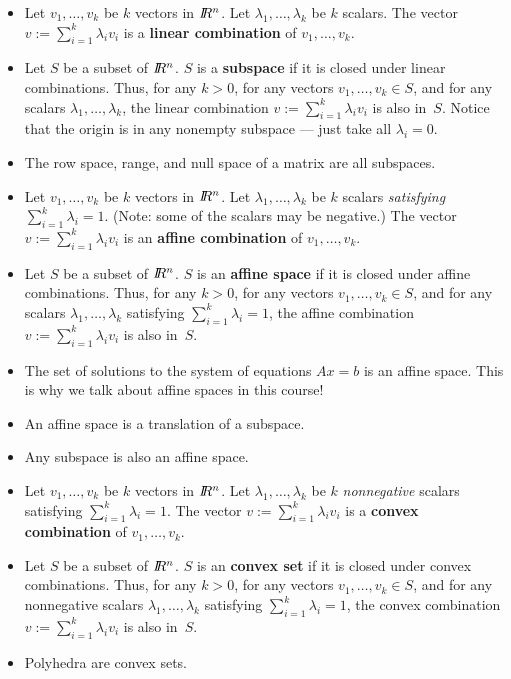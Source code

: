 \begin{itemize}
 \item
Let $v_1,\ldots,v_k$ be $k$ vectors in $I\!\!R^n$.
Let $\lambda_1,\ldots,\lambda_k$ be $k$ scalars.
The vector $v:=\sum_{i=1}^k\lambda_iv_i$ is a
{\bf linear combination} of $v_1,\ldots,v_k$.
 \item
Let $S$ be a subset of $I\!\!R^n$.
$S$ is a {\bf subspace} if it is closed under linear combinations.
Thus, for any $k>0$, for any vectors $v_1,\ldots,v_k \in S$,
and for any scalars $\lambda_1,\ldots,\lambda_k$, the linear
combination $v:=\sum_{i=1}^k\lambda_iv_i$ is also in~$S$.
Notice that the origin is in any nonempty subspace --- just take all
$\lambda_i=0$.
 \item
The row space, range, and null space of a matrix are all subspaces.
 \item
Let $v_1,\ldots,v_k$ be $k$ vectors in $I\!\!R^n$.
Let $\lambda_1,\ldots,\lambda_k$ be $k$ scalars
{\em satisfying $\sum_{i=1}^k\lambda_i=1$}.
(Note: some of the scalars may be negative.)
The vector $v:=\sum_{i=1}^k\lambda_iv_i$ is an
{\bf affine combination} of $v_1,\ldots,v_k$.
 \item
Let $S$ be a subset of $I\!\!R^n$.
$S$ is an {\bf affine space} if it is closed under affine combinations.
Thus, for any $k>0$, for any vectors $v_1,\ldots,v_k \in S$,
and for any scalars $\lambda_1,\ldots,\lambda_k$
satisfying $\sum_{i=1}^k\lambda_i=1$, the affine
combination $v:=\sum_{i=1}^k\lambda_iv_i$ is also in~$S$.
 \item
The set of solutions to the system of equations $Ax=b$ is an
affine space.
This is why we talk about affine spaces in this course!
 \item
An affine space is a translation of a subspace.
 \item
Any subspace is also an affine space.
 \item
Let $v_1,\ldots,v_k$ be $k$ vectors in $I\!\!R^n$.
Let $\lambda_1,\ldots,\lambda_k$ be $k$ {\em nonnegative} scalars
satisfying $\sum_{i=1}^k\lambda_i=1$.
The vector $v:=\sum_{i=1}^k\lambda_iv_i$ is a
{\bf convex combination} of $v_1,\ldots,v_k$.
 \item
Let $S$ be a subset of $I\!\!R^n$.
$S$ is an {\bf convex set} if it is closed under convex combinations.
Thus, for any $k>0$, for any vectors $v_1,\ldots,v_k \in S$,
and for any nonnegative scalars $\lambda_1,\ldots,\lambda_k$
satisfying $\sum_{i=1}^k\lambda_i=1$, the convex
combination $v:=\sum_{i=1}^k\lambda_iv_i$ is also in~$S$.
 \item
Polyhedra are convex sets.

\end{itemize}
